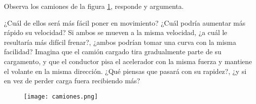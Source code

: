 Observa los camiones de la figura \ref{fig:camiones}, responde y argumenta.

\begin{minipage}[t]{0.7\linewidth}
    \begin{parts}
        ¿Cuál de ellos será más fácil poner en movimiento?
        ¿Cuál podría aumentar más rápido su velocidad?
        Si ambos se mueven a la misma velocidad, ¿a cuál le resultaría más difícil frenar?,
        ¿ambos podrían tomar una curva con la misma facilidad?
        Imagina que el camión cargado tira gradualmente parte de su cargamento,
        y que el conductor pisa el acelerador con la misma fuerza y mantiene el volante en la misma dirección.
        ¿Qué piensas que pasará con su rapidez?, ¿y si en vez de perder carga fuera recibiendo más?
    \end{parts}
\end{minipage}\hfill
\begin{minipage}[t]{0.25\linewidth}
    \begin{figure}[H]
        \centering
        \texttt{[image: camiones.png]}
        \label{fig:camiones}
    \end{figure}
\end{minipage}